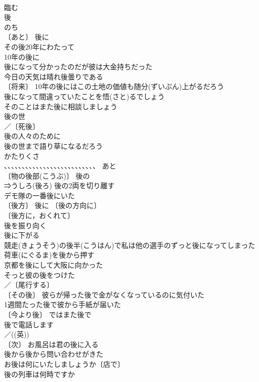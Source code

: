 \documentclass[8pt]{extreport}
\begin{document}
\begin{CJK}{UTF8}{min}
\\	臨む 
\\	後 
\\	のち 
\\	〔あと〕 後に 
\\	その後20年にわたって 
\\	10年の後に 
\\	後になって分かったのだが彼は大金持ちだった 
\\	今日の天気は晴れ後曇りである 
\\	〔将来〕 10年の後にはこの土地の価値も随分(ずいぶん)上がるだろう 
\\	後になって間違っていたことを悟(さと)るでしょう 
\\	そのことはまた後に相談しましょう 
\\	後の世 
\\	／〔死後〕
\\	後の人々のために 
\\	後の世まで語り草になるだろう 
\\	かたりくさ　
\\	、、、、、、、、、、、、、、、、、、、、、、、、、、 あと 
\\	〔物の後部(こうぶ)〕 後の 
\\	⇒うしろ(後ろ) 後の2両を切り離す 
\\	デモ隊の一番後にいた 
\\	〔後方〕 後に 〔後の方向に〕
\\	〔後方に，おくれて〕
\\	後を振り向く 
\\	後に下がる 
\\	競走(きょうそう)の後半(こうはん)で私は他の選手のずっと後になってしまった 
\\	荷車(にぐるま)を後から押す 
\\	京都を後にして大阪に向かった 
\\	そっと彼の後をつけた 
\\	／〔尾行する〕
\\	〔その後〕 彼らが帰った後で金がなくなっているのに気付いた 
\\	1週間たった後で彼から手紙が届いた 
\\	〔今より後〕 ではまた後で 
\\	後で電話します 
\\	／((英)) 
\\	〔次〕 お風呂は君の後に入る 
\\	後から後から問い合わせがきた 
\\	お後は何にいたしましょうか〔店で〕 
\\	後の列車は何時ですか 

\end{CJK}
\end{document}
